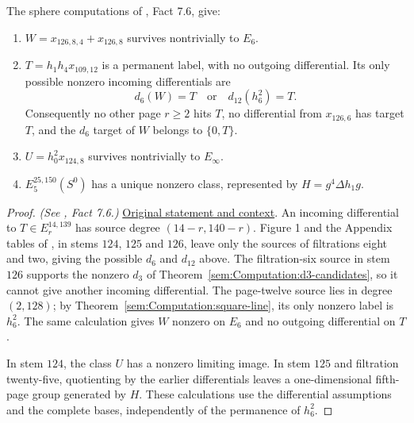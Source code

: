 \begin{fact}
\label{paper:7.6}
\label{fact:theta5sqAF}
\label{sem:Computation:incoming-control}
The sphere computations of \cite{LWX126}, Fact 7.6, give:
\begin{enumerate}
\item $W=x_{126,8,4}+x_{126,8}$ survives nontrivially to $E_6$.
\item $T=h_1h_4x_{109,12}$ is a permanent label, with no outgoing
 differential. Its only possible nonzero incoming differentials are
\[
 d_6(W)=T\quad\text{or}\quad d_{12}(h_6^2)=T.
\]
Consequently no other page $r\ge2$ hits $T$, no differential from
$x_{126,6}$ has target $T$, and the $d_6$ target of $W$ belongs to
$\{0,T\}$.
\item $U=h_0^2x_{124,8}$ survives nontrivially to $E_\infty$.
\item $E_5^{25,150}(S^0)$ has a unique nonzero class, represented by
$H=g^4\Delta h_1g$.
\end{enumerate}
\end{fact}
\begin{proof}
\textit{(See \cite{LWX126}, Fact 7.6.)}
\href{paper/main.tex.html#L2156}{Original statement and context}.
An incoming differential to $T\in E_r^{14,139}$ has source degree
$(14-r,140-r)$. Figure 1 and the Appendix tables of \cite{LWX126}, in
stems $124$, $125$ and $126$, leave only the sources of filtrations eight and two, giving
the possible $d_6$ and $d_{12}$ above. The filtration-six source in
stem $126$ supports the nonzero $d_3$ of
Theorem~\ref{sem:Computation:d3-candidates}, so it cannot give another
incoming differential. The page-twelve source lies in degree $(2,128)$; by
Theorem~\ref{sem:Computation:square-line}, its only nonzero label is
$h_6^2$. The same calculation gives $W$ nonzero on $E_6$ and no outgoing
differential on $T$.

In stem $124$, the class $U$ has a nonzero limiting image. In stem $125$
and filtration twenty-five, quotienting by the earlier differentials
leaves a one-dimensional fifth-page group generated by $H$. These
calculations use the differential assumptions and the complete bases,
independently of the permanence of $h_6^2$.
\end{proof}

